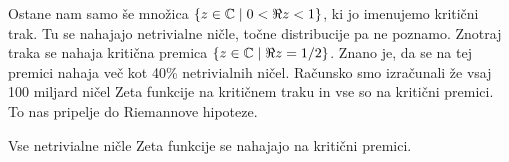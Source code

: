 Ostane nam samo še množica \(\{z\in \mathbb C\mid 0 < \Re z < 1\}\), ki jo imenujemo kritični trak. Tu se nahajajo netrivialne ničle, točne distribucije pa ne poznamo. Znotraj traka se nahaja kritična premica \(\{z\in \mathbb C \mid \Re z = 1/2\}\). Znano je, da se na tej premici nahaja več kot 40\% netrivialnih ničel\cite{Pratt2019}. Računsko smo izračunali že vsaj 100 miljard ničel Zeta funkcije na kritičnem traku in vse so na kritični premici\cite{racunskoniclezeta}. To nas pripelje do Riemannove hipoteze.

\begin{izrek}
    Vse netrivialne ničle Zeta funkcije se nahajajo na kritični premici.
\end{izrek}